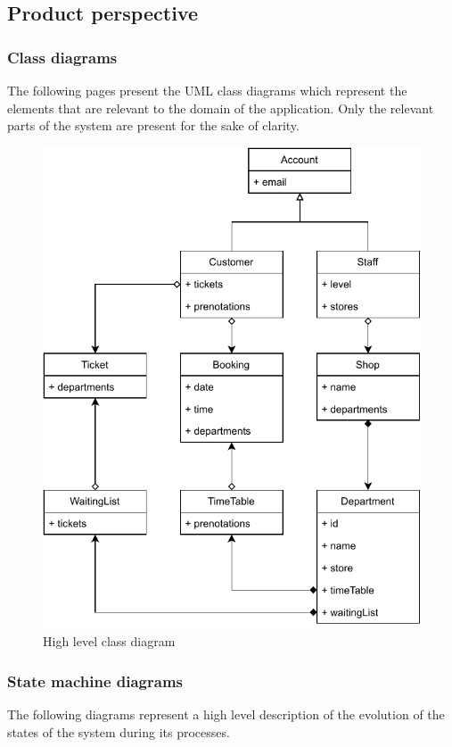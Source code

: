 \subsection{Product perspective}
\subsubsection{Class diagrams}
The following pages present the UML class diagrams which represent the elements that are relevant to the domain of the application. Only the relevant parts of the system are present for the sake of clarity.
\begin{figure}[H]
    \centering
    \includegraphics{Images/main-class-diag.pdf}
    \caption{\label{fig:metamodel}High level class diagram}
\end{figure}

\newpage
\subsubsection{State machine diagrams}
The following diagrams represent a high level description of the evolution of the states of the system during its processes.

